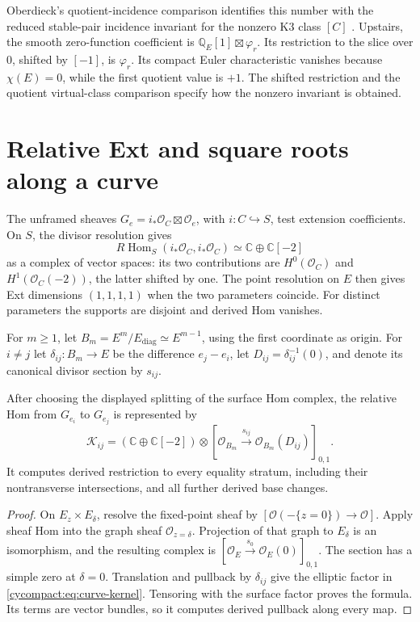 Oberdieck's quotient-incidence comparison identifies this
number with the reduced stable-pair incidence invariant for
the nonzero K3 class $[C]$ \cite{cycompact:Oberdieck}.
Upstairs, the smooth zero-function coefficient is
$\mathbb Q_E[1]\boxtimes\varphi_r$. Its restriction to the
slice over $0$, shifted by $[-1]$, is $\varphi_r$.
Its compact Euler characteristic vanishes because
$\chi(E)=0$, while the first quotient value is $+1$.
The shifted restriction and the quotient virtual-class
comparison specify how the nonzero invariant is obtained.

\section{Relative Ext and square roots along a curve}
\label{cycompact:sec:curve-ext}

The unframed sheaves
$G_e=i_*\mathcal O_C\boxtimes\mathcal O_e$, with
$i:C\hookrightarrow S$, test extension coefficients.
On $S$, the divisor resolution gives
\[
 R\operatorname{Hom}_S(i_*\mathcal O_C,i_*\mathcal O_C)
 \simeq\mathbb C\oplus\mathbb C[-2]
\]
as a complex of vector spaces: its two contributions are
$H^0(\mathcal O_C)$ and $H^1(\mathcal O_C(-2))$, the latter
shifted by one. The point resolution on $E$ then gives
Ext dimensions $(1,1,1,1)$ when the two parameters coincide.
For distinct parameters the supports are disjoint and
derived Hom vanishes.

For $m\geq1$, let $B_m=E^m/E_{\mathrm{diag}}\simeq E^{m-1}$, using the
first coordinate as origin. For $i\ne j$ let
$\delta_{ij}:B_m\to E$ be the difference $e_j-e_i$,
let $D_{ij}=\delta_{ij}^{-1}(0)$, and denote its canonical
divisor section by $s_{ij}$.

\begin{proposition}\label{cycompact:prop:curve-kernel}
After choosing the displayed splitting of the surface Hom
complex, the relative Hom from $G_{e_i}$ to $G_{e_j}$ is
represented by
\begin{equation}\label{cycompact:eq:curve-kernel}
 \mathcal K_{ij}=(\mathbb C\oplus\mathbb C[-2])\otimes
 [\mathcal O_{B_m}\xrightarrow{s_{ij}}
       \mathcal O_{B_m}(D_{ij})]_{0,1}.
\end{equation}
It computes derived restriction to every equality stratum,
including their nontransverse intersections, and all further
derived base changes.
\end{proposition}

\begin{proof}
On $E_z\times E_\delta$, resolve the fixed-point sheaf by
$[\mathcal O(-\{z=0\})\to\mathcal O]$.
Apply sheaf Hom into the graph sheaf $\mathcal O_{z=\delta}$.
Projection of that graph to $E_\delta$ is an isomorphism,
and the resulting complex is
$[\mathcal O_E\xrightarrow{s_0}\mathcal O_E(0)]_{0,1}$.
The section has a simple zero at $\delta=0$.
Translation and pullback by $\delta_{ij}$ give the elliptic
factor in \eqref{cycompact:eq:curve-kernel}. Tensoring with
the surface factor proves the formula. Its terms are vector
bundles, so it computes derived pullback along every map.
\end{proof}

